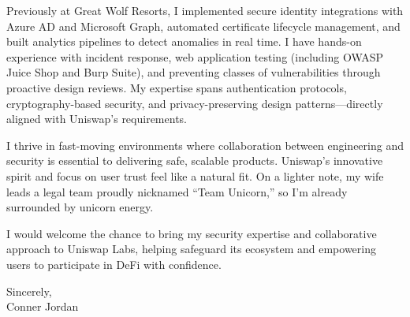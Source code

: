 \documentclass[letterpaper,11pt]{article}
\begin{document}
\vspace{16pt}

Previously at Great Wolf Resorts, I implemented secure identity integrations with Azure AD and Microsoft Graph, automated certificate lifecycle management, and built analytics pipelines to detect anomalies in real time. I have hands-on experience with incident response, web application testing (including OWASP Juice Shop and Burp Suite), and preventing classes of vulnerabilities through proactive design reviews. My expertise spans authentication protocols, cryptography-based security, and privacy-preserving design patterns—directly aligned with Uniswap’s requirements.

\vspace{16pt}

I thrive in fast-moving environments where collaboration between engineering and security is essential to delivering safe, scalable products. Uniswap’s innovative spirit and focus on user trust feel like a natural fit. On a lighter note, my wife leads a legal team proudly nicknamed “Team Unicorn,” so I’m already surrounded by unicorn energy.

\vspace{16pt}

I would welcome the chance to bring my security expertise and collaborative approach to Uniswap Labs, helping safeguard its ecosystem and empowering users to participate in DeFi with confidence.

\vspace{16pt}

Sincerely,\\
Conner Jordan
\end{document}
